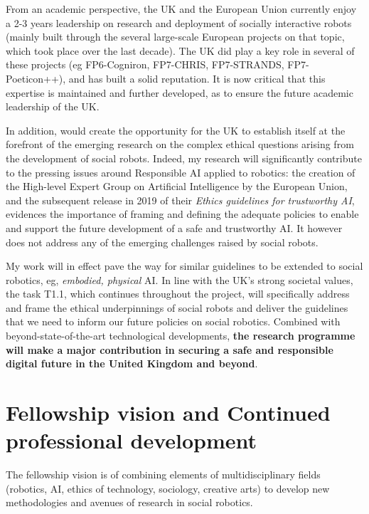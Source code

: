 From an academic perspective, the UK and the European Union currently enjoy a
2-3 years leadership on research and deployment of socially interactive robots
(mainly built through the several large-scale European projects on that topic,
which took place over the last decade). The UK did play a key role in several of
these projects (eg FP6-Cogniron, FP7-CHRIS, FP7-STRANDS, FP7-Poeticon++), and
has built a solid reputation. It is now critical that this expertise is
maintained and further developed, as to ensure the future academic leadership of
the UK.

In addition, \project would create the opportunity for the UK to establish
itself at the forefront of the emerging research on the complex ethical
questions arising from the development of social robots. Indeed, my research
will significantly contribute to the pressing issues around Responsible AI
applied to robotics: the creation of the High-level Expert Group on Artificial
Intelligence by the European Union, and the subsequent release in 2019 of their
\emph{Ethics guidelines for trustworthy AI}, evidences the importance of framing
and defining the adequate policies to enable and support the future development
of a safe and trustworthy AI. It however does not address any of the emerging
challenges raised by social robots.

My work will in effect pave the way for similar guidelines to be extended to
social robotics, eg, \emph{embodied, physical} AI. In line with the UK's strong
societal values, the task T1.1, which continues throughout the project, will
specifically address and frame the ethical underpinnings of social robots
and deliver the guidelines that we need to inform our future policies on social
robotics. Combined with beyond-state-of-the-art technological developments,
\textbf{the \project research programme will make a major contribution in
securing a safe and responsible digital future in the United Kingdom and beyond}. 



\section{Fellowship vision and Continued professional development}

The fellowship vision is of combining elements of multidisciplinary fields
(robotics, AI, ethics of technology, sociology, creative arts) to
develop new methodologies and avenues of research in social robotics.

